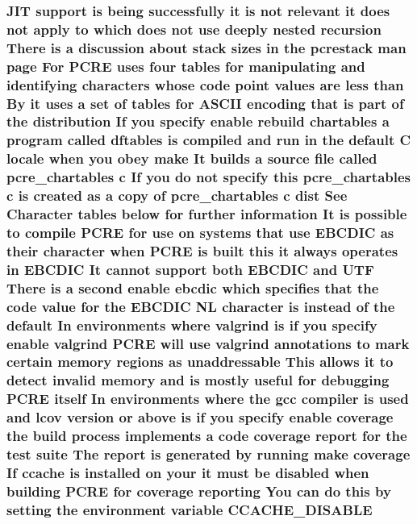 \subsubsection[{\texorpdfstring{C\+C\+A\+C\+H\+E\+\_\+\+D\+I\+S\+A\+B\+LE}{CCACHE_DISABLE}}]{ J\+IT {\bf support} {\bf is} being successfully {\bf it} {\bf is} {\bf not} relevant {\bf it} does {\bf not} apply {\bf to} {\bf which} does {\bf not} use deeply nested {\bf recursion} There {\bf is} {\bf a} discussion about {\bf stack} sizes {\bf in} the pcrestack {\bf man} page For {\bf P\+C\+RE} uses four {\bf tables} for manipulating and identifying {\bf characters} whose {\bf code} {\bf point} {\bf values} {\bf are} less {\bf than} By {\bf it} uses {\bf a} {\bf set} {\bf of} {\bf tables} for {\bf A\+S\+C\+II} {\bf encoding} that {\bf is} part {\bf of} the distribution If you specify enable rebuild {\bf chartables} {\bf a} {\bf program} called {\bf dftables} {\bf is} {\bf compiled} and {\bf run} {\bf in} the {\bf default} {\bf C} {\bf locale} when you obey {\bf make} It builds {\bf a} {\bf source} {\bf file} called pcre\+\_\+chartables {\bf c} If you {\bf do} {\bf not} specify {\bf this} pcre\+\_\+chartables {\bf c} {\bf is} created {\bf as} {\bf a} copy {\bf of} pcre\+\_\+chartables {\bf c} {\bf dist} See Character {\bf tables} {\bf below} for further information It {\bf is} {\bf possible} {\bf to} {\bf compile} {\bf P\+C\+RE} for use {\bf on} {\bf systems} that use E\+B\+C\+D\+IC {\bf as} their {\bf character} when {\bf P\+C\+RE} {\bf is} {\bf built} {\bf this} {\bf it} always operates {\bf in} E\+B\+C\+D\+IC It cannot {\bf support} both E\+B\+C\+D\+IC and U\+TF There {\bf is} {\bf a} {\bf second} enable ebcdic {\bf which} specifies that the {\bf code} {\bf value} for the E\+B\+C\+D\+IC {\bf NL} {\bf character} {\bf is} instead {\bf of} the {\bf default} In {\bf environments} {\bf where} valgrind {\bf is} {\bf if} you specify enable valgrind {\bf P\+C\+RE} will use valgrind annotations {\bf to} {\bf mark} certain {\bf memory} regions {\bf as} unaddressable This allows {\bf it} {\bf to} detect invalid {\bf memory} and {\bf is} mostly useful for debugging {\bf P\+C\+RE} {\bf itself} In {\bf environments} {\bf where} the {\bf gcc} {\bf compiler} {\bf is} {\bf used} and lcov version {\bf or} {\bf above} {\bf is} {\bf if} you specify enable coverage the build {\bf process} implements {\bf a} {\bf code} coverage report for the test suite The report {\bf is} {\bf generated} by running {\bf make} coverage If ccache {\bf is} {\bf installed} {\bf on} your {\bf it} must {\bf be} disabled when building {\bf P\+C\+RE} for coverage reporting You {\bf can} {\bf do} {\bf this} by {\bf setting} the {\bf environment} variable C\+C\+A\+C\+H\+E\+\_\+\+D\+I\+S\+A\+B\+LE}\hypertarget{README_8txt_acb3a895e18335fd2616772174b0b6a8e}{}\label{README_8txt_acb3a895e18335fd2616772174b0b6a8e}
